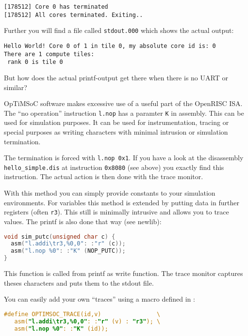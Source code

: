 \begin{lstlisting}
[178512] Core 0 has terminated
[178512] All cores terminated. Exiting..
\end{lstlisting}

Further you will find a file called \verb|stdout.000| which shows the
actual output:

\begin{lstlisting}
Hello World! Core 0 of 1 in tile 0, my absolute core id is: 0
There are 1 compute tiles:
 rank 0 is tile 0
\end{lstlisting}

But how does the actual printf-output get there when there is no UART
or similar?

OpTiMSoC software makes excessive use of a useful part of the OpenRISC ISA. The
``no operation'' instruction \verb|l.nop| has a paramter \verb|K| in assembly.
This can be used for simulation purposes. It can be used for instrumentation,
tracing or special purposes as writing characters with minimal intrusion or
simulation termination.

The termination is forced with \verb|l.nop 0x1|. If you have a look at
the disassembly \verb|hello_simple.dis| at instruction \verb|0x8080|
(see above) you exactly find this instruction. The actual action is
then done with the trace monitor.

With this method you can simply provide constants to your simulation
environments. For variables this method is extended by putting data in
further registers (often \verb|r3|). This still is minimally intrusive
and allows you to trace values. The printf is also done that way (see
newlib):

\begin{lstlisting}[language=C]
void sim_putc(unsigned char c) {
  asm("l.addi\tr3,%0,0": :"r" (c));
  asm("l.nop %0": :"K" (NOP_PUTC));
}
\end{lstlisting}

This function is called from printf as write function. The trace
monitor captures theses characters and puts them to the stdout file.

You can easily add your own ``traces'' using a macro defined in
:

\begin{lstlisting}[language=C]
#define OPTIMSOC_TRACE(id,v)                \
   asm("l.addi\tr3,%0,0": :"r" (v) : "r3"); \
   asm("l.nop %0": :"K" (id));
\end{lstlisting}

